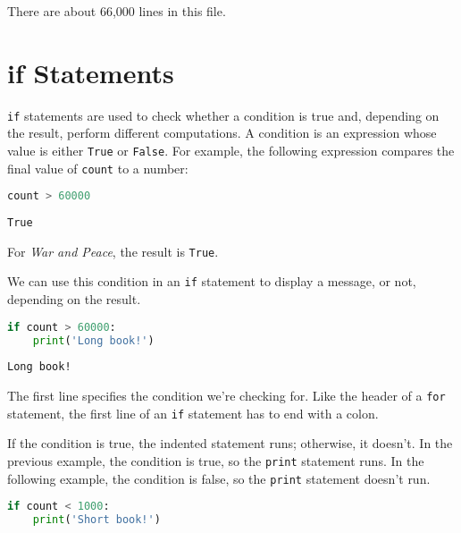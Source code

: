 There are about 66,000 lines in this file.

\section{if Statements}\label{if-statements}

\passthrough{\lstinline!if!} statements are used to check whether a
condition is true and, depending on the result, perform different
computations. A condition is an expression whose value is either
\passthrough{\lstinline!True!} or \passthrough{\lstinline!False!}. For
example, the following expression compares the final value of
\passthrough{\lstinline!count!} to a number:

\begin{lstlisting}[language=Python,style=source]
count > 60000
\end{lstlisting}

\begin{lstlisting}[style=output]
True
\end{lstlisting}

For \emph{War and Peace}, the result is \passthrough{\lstinline!True!}.

\pagebreak

We can use this condition in an \passthrough{\lstinline!if!} statement
to display a message, or not, depending on the result.

\begin{lstlisting}[language=Python,style=source]
if count > 60000:
    print('Long book!')
\end{lstlisting}

\begin{lstlisting}[style=output]
Long book!
\end{lstlisting}

The first line specifies the condition we're checking for. Like the
header of a \passthrough{\lstinline!for!} statement, the first line of
an \passthrough{\lstinline!if!} statement has to end with a colon.

If the condition is true, the indented statement runs; otherwise, it
doesn't. In the previous example, the condition is true, so the
\passthrough{\lstinline!print!} statement runs. In the following
example, the condition is false, so the \passthrough{\lstinline!print!}
statement doesn't run.

\begin{lstlisting}[language=Python,style=source]
if count < 1000:
    print('Short book!')
\end{lstlisting}

